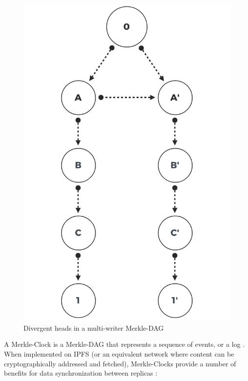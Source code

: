 \documentclass{textile}
\begin{document}
\begin{figure}
  \includegraphics[width=\linewidth]{figures/Divergent_Heads.png}
  \caption{Divergent heads in a multi-writer Merkle-DAG }
  \label{fig:merkledag}
\end{figure}

A Merkle-Clock is a Merkle-DAG that represents a sequence of events, or a log \cite{sanjuanMerkleCRDTs2019}. When implemented on IPFS (or an equivalent network where content can be cryptographically addressed and fetched), Merkle-Clocks provide a number of benefits for data synchronization between replicas \cite[sec. 4.3]{sanjuanMerkleCRDTs2019}:
\end{document}

